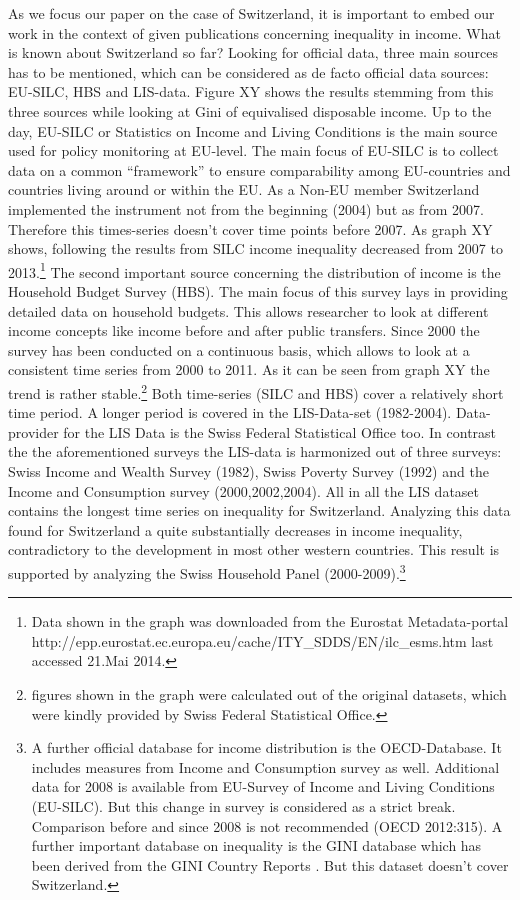 As we focus our paper on the case of Switzerland, it is important to embed our work in the context of given publications concerning inequality in income. What is known about Switzerland so far? Looking for official data, three main sources has to be mentioned, which can be considered as de facto official data sources: EU-SILC, HBS and LIS-data. Figure XY shows the results stemming from this three sources while looking at Gini of equivalised disposable income. Up to the day, EU-SILC or Statistics on Income and Living Conditions is the main source used for policy monitoring at EU-level. The main focus of EU-SILC is to collect data on a common ``framework'' to ensure comparability among EU-countries and countries living around or within the EU. As a Non-EU member Switzerland implemented the instrument not from the beginning (2004) but as from 2007. Therefore this times-series doesn't cover time points before 2007. As graph XY shows, following the results from SILC income inequality decreased from 2007 to 2013.\footnote{Data shown in the graph was downloaded from the Eurostat Metadata-portal http://epp.eurostat.ec.europa.eu/cache/ITY_SDDS/EN/ilc_esms.htm last accessed 21.Mai 2014.} The second important source concerning the distribution of income is the Household Budget Survey (HBS). The main focus of this survey lays in providing detailed data on household budgets. This allows researcher to look at different income concepts like income before and after public transfers. Since 2000 the survey has been conducted on a continuous basis, which allows to look at a consistent time series from 2000 to 2011. As it can be seen from graph XY the trend is rather stable.\footnote{figures shown in the graph were calculated out of the original datasets, which were kindly provided by Swiss Federal Statistical Office.} Both time-series (SILC and HBS) cover a relatively short time period. A longer period is covered in the LIS-Data-set (1982-2004). Data-provider for the LIS Data is the Swiss Federal Statistical Office too. In contrast the the aforementioned surveys the LIS-data is harmonized out of three surveys: Swiss Income and Wealth Survey (1982), Swiss Poverty Survey (1992) and the Income and Consumption survey (2000,2002,2004).  All in all the LIS dataset contains the longest time series on inequality for Switzerland. Analyzing this data \citet{gornick_income_2013} found for Switzerland a quite substantially decreases in income inequality, contradictory to the development in most other western countries. This result is supported by \citet{grabka_evolution_2012} analyzing the Swiss Household Panel (2000-2009).\footnote{A further official database for income distribution is the OECD-Database. It includes measures from Income and Consumption survey as well. Additional data for 2008 is available from EU-Survey of Income and Living Conditions (EU-SILC). But this change in survey is considered as a strict break. Comparison before and since 2008 is not recommended (OECD 2012:315). A further important database on inequality is the GINI database which has been derived from the GINI Country Reports \citep{nolan_changing_2014}. But this dataset doesn't cover Switzerland.}  \\


